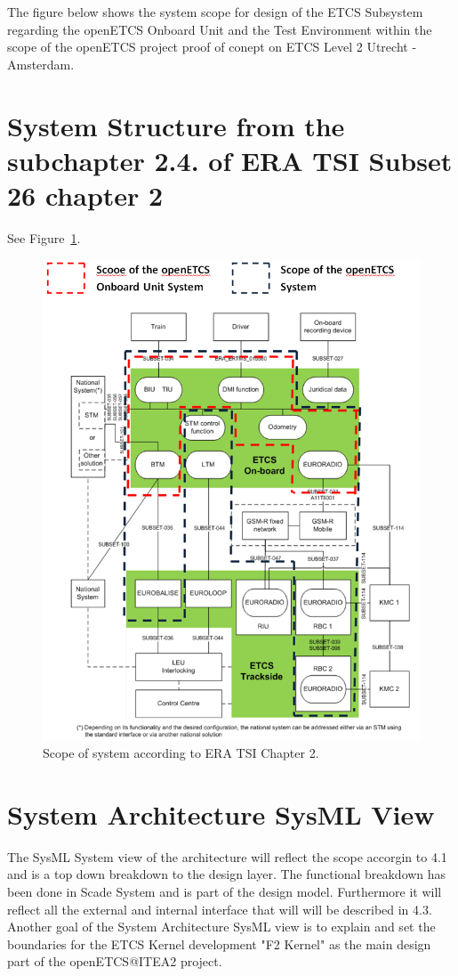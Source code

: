 
The figure below shows the system scope for design of the ETCS Subsystem regarding the openETCS Onboard Unit and the Test Environment within the scope of the openETCS project proof of conept on ETCS Level 2 Utrecht - Amsterdam.

\section{System Structure from the subchapter 2.4. of ERA TSI Subset 26 chapter 2}
See Figure~\ref{Scope of System according to ERA TSI Chapter 2}.
\begin{figure}
\includegraphics[width=.9\textwidth]{images/ArchitectureSRS}
\caption{Scope of system according to ERA TSI Chapter 2.}
\label{Scope of System according to ERA TSI Chapter 2}
\end{figure}

\section{System Architecture SysML View}
The SysML System view of the architecture will reflect the scope accorgin to 4.1 and is a top down breakdown to the design layer. The functional breakdown has been done in Scade System and is part of the design model. Furthermore it will reflect all the external and internal interface that will will be described in 4.3. Another goal of the System Architecture SysML view is to explain and set the boundaries for the ETCS Kernel development "F2 Kernel" as the main design part of the openETCS@ITEA2 project.


